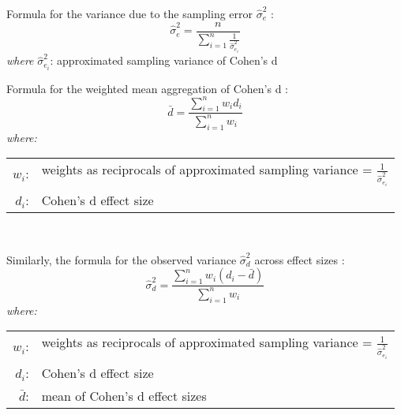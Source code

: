 \par Formula for the variance due to the sampling error $\hat{\sigma}^2_{e}$ \parencite{morris2002combining}:
\begin{equation} \label{eq:variance_sampling_total}
    \hat{\sigma}^2_{e} = \frac{n}{\sum_{i=1}^{n} \frac{1}{\hat{\sigma}^2_{e_{i}}}}
\end{equation}
\hspace{0.5cm} \textit{where} $\hat{\sigma}^2_{e_{i}}$: approximated sampling variance of Cohen's d

\par Formula for the weighted mean aggregation of Cohen's d \parencite{borenstein2021introduction, hedges1985statistical, morris2002combining}:
\begin{equation} \label{eq:mean_weighted}
    \bar{d} = \frac{\sum_{i=1}^{n} w_{i} d_{i}}{\sum_{i=1}^{n} w_{i}}
\end{equation}
\hspace{0.5cm} \textit{where:} \\
\hspace*{3em}
\begin{tabular}{rl}
    $w_{i}$:& weights as reciprocals of approximated sampling variance = $\frac{1}{\hat{\sigma}^2_{e_{i}}}$ \\
    $d_{i}$:& Cohen's d effect size \\
\end{tabular} \\

\par Similarly, the formula for the observed variance $\hat{\sigma}^2_{d}$ across effect sizes \parencite{morris2002combining}:
\begin{equation} \label{eq:variance_observed}
    \hat{\sigma}^2_{d} = \frac{\sum_{i=1}^{n} w_{i} (d_{i}-\bar{d})}{\sum_{i=1}^{n} w_{i}}
\end{equation}
\hspace{0.5cm} \textit{where:} \\
\hspace*{3em}
\begin{tabular}{rl}
    $w_{i}$:& weights as reciprocals of approximated sampling variance = $\frac{1}{\hat{\sigma}^2_{e_{i}}}$ \\
    $d_{i}$:& Cohen's d effect size \\
    $\bar{d}$:& mean of Cohen's d effect sizes \\
\end{tabular} \\

